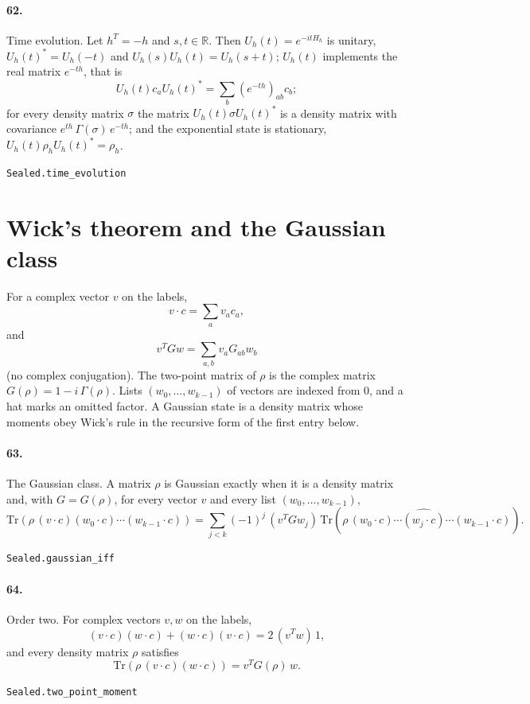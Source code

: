 \documentclass[11pt]{article}
\begin{document}
\paragraph{62.} Time evolution. Let $h^T = -h$ and $s, t \in \mathbb R$. Then $U_h(t) = e^{-itH_h}$ is unitary, $U_h(t)^* = U_h(-t)$ and $U_h(s) U_h(t) = U_h(s + t)$; $U_h(t)$ implements the real matrix $e^{-th}$, that is \[U_h(t) c_a U_h(t)^* = \sum_b (e^{-th})_{ab} c_b;\] for every density matrix $\sigma$ the matrix $U_h(t)\sigma U_h(t)^*$ is a density matrix with covariance $e^{th}\,\Gamma(\sigma)\,e^{-th}$; and the exponential state is stationary, $U_h(t) \rho_h U_h(t)^* = \rho_h$.\par{\footnotesize\texttt{Sealed.time\_evolution}}

\section*{Wick's theorem and the Gaussian class}
For a complex vector $v$ on the labels, \[v \cdot c = \sum_a v_a c_a,\] and \[v^T G w = \sum_{a,b} v_a G_{ab} w_b\] (no complex conjugation). The two-point matrix of $\rho$ is the complex matrix $G(\rho) = 1 - i\,\Gamma(\rho)$. Lists $(w_0, \dots, w_{k-1})$ of vectors are indexed from $0$, and a hat marks an omitted factor. A Gaussian state is a density matrix whose moments obey Wick's rule in the recursive form of the first entry below.

\paragraph{63.} The Gaussian class. A matrix $\rho$ is Gaussian exactly when it is a density matrix and, with $G = G(\rho)$, for every vector $v$ and every list $(w_0, \dots, w_{k-1})$, \[\mathrm{Tr}(\rho\,(v\cdot c)(w_0\cdot c)\cdots(w_{k-1}\cdot c)) = \sum_{j<k} (-1)^j\, (v^T G w_j)\, \mathrm{Tr}(\rho\,(w_0\cdot c)\cdots\widehat{(w_j\cdot c)}\cdots (w_{k-1}\cdot c)).\]\par{\footnotesize\texttt{Sealed.gaussian\_iff}}

\paragraph{64.} Order two. For complex vectors $v, w$ on the labels, \[(v\cdot c)(w\cdot c) + (w\cdot c)(v\cdot c) = 2\,(v^T w)\,1,\] and every density matrix $\rho$ satisfies \[\mathrm{Tr}(\rho\,(v\cdot c)(w\cdot c)) = v^T G(\rho)\, w.\]\par{\footnotesize\texttt{Sealed.two\_point\_moment}}
\end{document}
